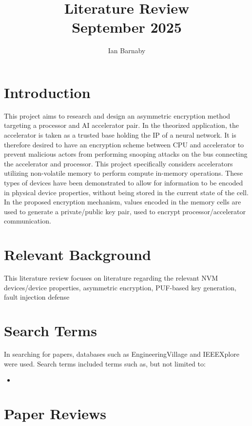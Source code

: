 \documentclass[sigconf,authoryear]{acmart}
\title{Literature Review\protect\\ \large September 2025}
\author{Ian Barnaby}\author{}\author{}
\begin{document}
\maketitle

\section{Introduction}
This project aims to research and design an asymmetric encryption method targeting a processor and AI accelerator pair. In the 
theorized application, the accelerator is taken as a trusted base holding the IP of a neural network. It is therefore desired to
have an encryption scheme between CPU and accelerator to prevent malicious actors from performing snooping attacks on the bus connecting
the accelerator and processor. This project specifically considers accelerators utilizing non-volatile memory to perform compute 
in-memory operations. These types of devices have been demonstrated to allow for information to be encoded in physical device 
properties, without being stored in the current state of the cell. In the proposed encryption mechanism, values encoded 
in the memory cells are used to generate a private/public key pair, used to encrypt processor/accelerator communication.

\section{Relevant Background}
This literature review focuses on literature regarding the relevant NVM devices/device properties, asymmetric encryption, PUF-based key
generation, fault injection defense


\section{Search Terms}
In searching for papers, databases such as EngineeringVillage and IEEEXplore were used. Search terms included terms such as, 
but not limited to:
\begin{itemize}
    \item 
\end{itemize}


\section{Paper Reviews}
\end{document}

